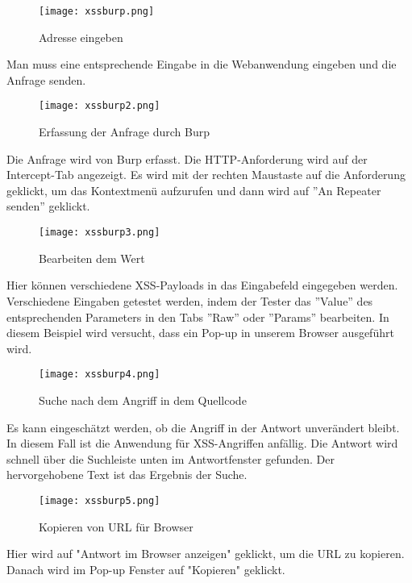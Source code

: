\begin{figure}[h]
	\centering
	\texttt{[image: xssburp.png]}
	\caption{Adresse eingeben}
\end{figure}

Man muss eine entsprechende Eingabe in die Webanwendung eingeben und die Anfrage senden.

\newpage

\begin{figure}[h]
	\centering
	\texttt{[image: xssburp2.png]}
	\caption{Erfassung der Anfrage durch Burp}
\end{figure}

Die Anfrage wird von Burp erfasst. Die HTTP-Anforderung wird auf der Intercept-Tab angezeigt. Es wird mit der rechten Maustaste auf die Anforderung geklickt, um das Kontextmenü aufzurufen und dann wird auf ''An Repeater senden'' geklickt.

\begin{figure}[h]
	\centering
	\texttt{[image: xssburp3.png]}
	\caption{Bearbeiten dem Wert}
\end{figure}

Hier können verschiedene XSS-Payloads in das Eingabefeld eingegeben werden. Verschiedene Eingaben getestet werden, indem der Tester das ''Value'' des entsprechenden Parameters in den Tabs ''Raw'' oder ''Params'' bearbeiten. In diesem Beispiel wird versucht, dass ein Pop-up in unserem Browser ausgeführt wird.

\newpage

\begin{figure}[h]
	\centering
	\texttt{[image: xssburp4.png]}
	\caption{Suche nach dem Angriff in dem Quellcode}
\end{figure}

Es kann eingeschätzt werden, ob die Angriff in der Antwort unverändert bleibt. In diesem Fall ist die Anwendung für XSS-Angriffen anfällig. Die Antwort wird schnell über die Suchleiste unten im Antwortfenster gefunden. Der hervorgehobene Text ist das Ergebnis der Suche.

\begin{figure}[h]
	\centering
	\texttt{[image: xssburp5.png]}
	\caption{Kopieren von URL für Browser}
\end{figure}

Hier wird auf "Antwort im Browser anzeigen" geklickt, um die URL zu kopieren. Danach wird im Pop-up Fenster auf "Kopieren" geklickt.

\newpage

